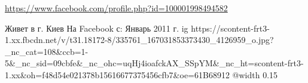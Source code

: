  
 
 
 
 

\url{https://www.facebook.com/profile.php?id=100001998494582}\par
Живет в г. Киев
На Facebook с: Январь 2011 г.
\ifcmt
  ig https://scontent-frt3-1.xx.fbcdn.net/v/t31.18172-8/335761_167031853373430_4126959_o.jpg?_nc_cat=108&ccb=1-5&_nc_sid=09cbfe&_nc_ohc=uqHj4ioafckAX_SSpYM&_nc_ht=scontent-frt3-1.xx&oh=f48d54e021378b15616677375456cfb7&oe=61B68912
  @width 0.15
\fi
